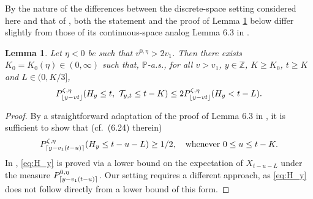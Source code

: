 \documentclass[12pt,reqno,oneside]{amsart}
\numberwithin{equation}{section}
\newtheorem{lemma}[theorem]{Lemma}
\theoremstyle{definition}
\theoremstyle{remark}
\newcommand{\Z}{\mathbb{Z}}
\newcommand{\PP}{\mathbb{P}}
\DeclarePairedDelimiter{\ceil}{\lceil}{\rceil}
\DeclarePairedDelimiter{\floor}{\lfloor}{\rfloor}
\begin{document}
By the nature of the differences between the discrete-space setting considered here and that of \cite{CDO25}, both the statement and the proof of
Lemma \ref{lemma_3L<K} below differ slightly from those of its continuous-space analog Lemma 6.3 in \cite{CDO25}.
\begin{lemma}
  \label{lemma_3L<K}
  Let $\eta <0$ be such that $v^{0,\eta} > 2v_1$.
  Then there exists $K_0=K_0(\eta) \in (0,\infty)$ such that, $\PP$-a.s., for all $v> v_1$, $y \in \Z$, $K \geq K_0$, $t \geq K$ and $L \in (0,K/3]$,
  \begin{equation*}
    P^{\zeta, \eta}_{\floor{ y-vt }}(H_y \leq t, \
      \mathcal{T}_{y,t}\leq t-K)
    \leq 2P^{\zeta, \eta}_{\floor {y-vt}}(H_y <t-L).
  \end{equation*}
\end{lemma}
\begin{proof}
  By a straightforward adaptation of the proof of Lemma 6.3 in \cite{CDO25},
  it is sufficient to show that (cf.~(6.24) therein)
  \begin{equation}\label{eq:H_y}
    P^{\zeta, \eta}_{\ceil{y- v_1(t-u)}}(H_y \leq t-u-L) \geq 1/2, \quad \text{whenever } 0 \leq u \leq t-K.
  \end{equation}
  In \cite{CDO25}, \eqref{eq:H_y} is proved via a lower bound on the expectation of $X_{t-u-L}$ under the measure $P^{0, \eta}_{\ceil{y- v_1(t-u)}}$. Our setting requires a different approach, as \eqref{eq:H_y} does not follow directly from a lower bound of this form.


\end{proof}
\end{document}
